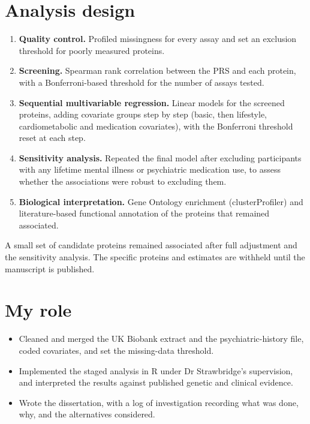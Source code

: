 \documentclass[10.5pt]{article}
\begin{document}
\section{Analysis design}
\begin{enumerate}
  \item \textbf{Quality control.} Profiled missingness for every assay and set an exclusion threshold for
        poorly measured proteins.
  \item \textbf{Screening.} Spearman rank correlation between the PRS and each protein, with a
        Bonferroni-based threshold for the number of assays tested.
  \item \textbf{Sequential multivariable regression.} Linear models for the screened proteins, adding covariate
        groups step by step (basic, then lifestyle, cardiometabolic and medication covariates), with the
        Bonferroni threshold reset at each step.
  \item \textbf{Sensitivity analysis.} Repeated the final model after excluding participants with any lifetime
        mental illness or psychiatric medication use, to assess whether the associations were robust to
        excluding them.
  \item \textbf{Biological interpretation.} Gene Ontology enrichment (clusterProfiler) and literature-based
        functional annotation of the proteins that remained associated.
\end{enumerate}
A small set of candidate proteins remained associated after full adjustment and the sensitivity analysis.
The specific proteins and estimates are withheld until the manuscript is published.

\section{My role}
\begin{itemize}
  \item Cleaned and merged the UK Biobank extract and the psychiatric-history file, coded covariates, and set
        the missing-data threshold.
  \item Implemented the staged analysis in R under Dr Strawbridge's supervision, and interpreted the results
        against published genetic and clinical evidence.
  \item Wrote the dissertation, with a log of investigation recording what was done, why, and the
        alternatives considered.
\end{itemize}
\end{document}
